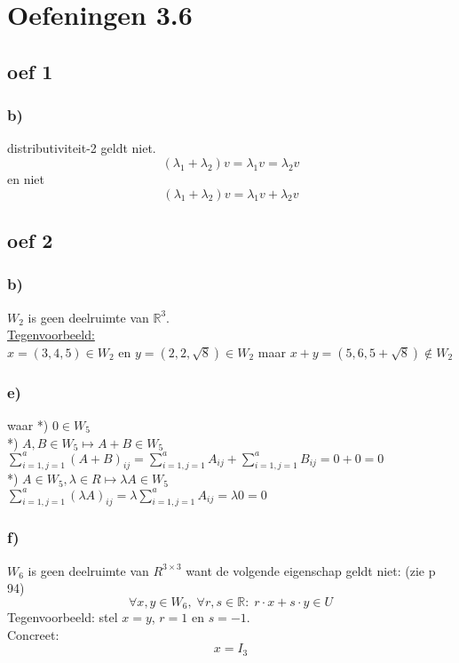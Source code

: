 \documentclass[lineaire_algebra_oplossingen.tex]{subfiles}
\begin{document}
\section{Oefeningen 3.6}

\subsection{oef 1}
\subsubsection*{b)}
distributiviteit-2 geldt niet.
\[
(\lambda_1 + \lambda_2)v = \lambda_1v = \lambda_2v
\]
en niet
\[
(\lambda_1 + \lambda_2)v = \lambda_1v+\lambda_2v
\]

\subsection{oef 2}
\subsubsection*{b)}
$W_2$ is geen deelruimte van $\mathbb{R}^{3}$.\\
\underline{Tegenvoorbeeld:}\\
$x = (3, 4, 5) \in W_2$ en $y = (2, 2, \sqrt{8}) \in W_2$ maar $x + y = (5, 6, 5 + \sqrt{8}) \not \in W_2$

\subsubsection*{e) }
waar
*) $0 \in W_5$ \\
*) $A,B \in W_5 \longmapsto A+B \in W_5$ \\
$ \sum\limits_{i=1,j=1}^a (A+B)_{ij} = \sum\limits_{i=1,j=1}^a A_{ij} + \sum\limits_{i=1,j=1}^a B_{ij} = 0+0 = 0 $ \\
*) $ A \in W_5, \lambda \in R \longmapsto \lambda A \in W_5$ \\
$ \sum\limits_{i=1,j=1}^a (\lambda A)_{ij} = \lambda \sum\limits_{i=1,j=1}^a A_{ij} = \lambda 0 = 0$


\subsubsection*{f)}
$W_6$ is geen deelruimte van $R^{3\times 3}$ want de volgende eigenschap geldt niet: (zie p 94)
\[
\forall x,y\in W_6,\;\forall r,s\in\mathbb{R}:\; r\cdot x+s\cdot y\in U
\]
Tegenvoorbeeld:
stel $x=y$, $r=1$ en $s=-1$.\\
Concreet:
\[
x = I_3
\]
\end{document}
